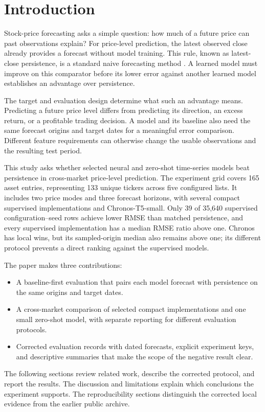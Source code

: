 \section{Introduction}

Stock-price forecasting asks a simple question: how much of a future price can past observations explain? For price-level prediction, the latest observed close already provides a forecast without model training. This rule, known as latest-close persistence, is a standard naive forecasting method \cite{hyndman2018forecasting}. A learned model must improve on this comparator before its lower error against another learned model establishes an advantage over persistence.

The target and evaluation design determine what such an advantage means. Predicting a future price level differs from predicting its direction, an excess return, or a profitable trading decision. A model and its baseline also need the same forecast origins and target dates for a meaningful error comparison. Different feature requirements can otherwise change the usable observations and the resulting test period.

This study asks whether selected neural and zero-shot time-series models beat persistence in cross-market price-level prediction. The experiment grid covers 165 asset entries, representing 133 unique tickers across five configured lists. It includes two price modes and three forecast horizons, with several compact supervised implementations and Chronos-T5-small. Only 39 of 35,640 supervised configuration--seed rows achieve lower RMSE than matched persistence, and every supervised implementation has a median RMSE ratio above one. Chronos has local wins, but its sampled-origin median also remains above one; its different protocol prevents a direct ranking against the supervised models.

The paper makes three contributions:
\begin{itemize}
\item A baseline-first evaluation that pairs each model forecast with persistence on the same origins and target dates.
\item A cross-market comparison of selected compact implementations and one small zero-shot model, with separate reporting for different evaluation protocols.
\item Corrected evaluation records with dated forecasts, explicit experiment keys, and descriptive summaries that make the scope of the negative result clear.
\end{itemize}

The following sections review related work, describe the corrected protocol, and report the results. The discussion and limitations explain which conclusions the experiment supports. The reproducibility sections distinguish the corrected local evidence from the earlier public archive.

